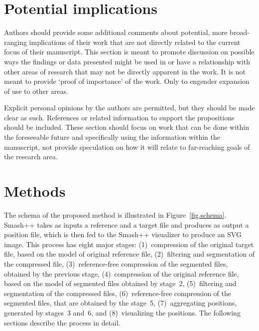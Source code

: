 \documentclass[a4paper,num-refs]{oup-contemporary}
\begin{document}


\section{Potential implications}

Authors should provide some additional comments about potential, more broad-ranging implications of their work that are not directly related to the current focus of their manuscript. This section is meant to promote discussion on possible ways the findings or data presented might be used in or have a relationship with other areas of research that may not be directly apparent in the work. It is not meant to provide `proof of importance' of the work. Only to engender expansion of use to other areas. 

Explicit personal opinions by the authors are permitted, but they should be made clear as such. References or related information to support the propositions should be included. These section should focus on work that can be done within the foreseeable future and specifically using the information within the manuscript, not provide speculation on how it will relate to far-reaching goals of the research area.


\section{Methods} \label{sec.methods}
The schema of the proposed method is illustrated in Figure~\ref{fig.schema}. Smash++ takes as inputs a reference and a target file and produces as output a position file, which is then fed to the Smash++ visualizer to produce an SVG image. This process has eight major stages: (1)~compression of the original target file, based on the model of original reference file, (2)~filtering and segmentation of the compressed file, (3)~reference-free compression of the segmented files, obtained by the previous stage, (4)~compression of the original reference file, based on the model of segmented files obtained by stage~2, (5)~filtering and segmentation of the compressed files, (6)~reference-free compression of the segmented files, that are obtained by the stage~5, (7)~aggregating positions, generated by stages~3 and~6, and (8)~visualizing the positions. The following sections describe the process in detail.
\end{document}
